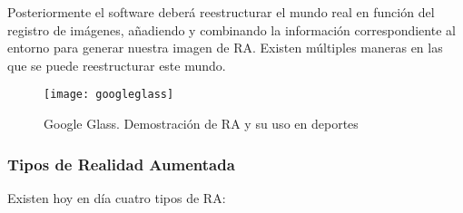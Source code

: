 Posteriormente el software deberá reestructurar el mundo real en función del registro de imágenes, añadiendo y combinando la información correspondiente al entorno para generar nuestra imagen de RA. Existen múltiples maneras en las que se puede reestructurar este mundo. 

\begin{figure}[h]
    \centering
    \texttt{[image: googleglass]}
    \caption{Google Glass. Demostración de RA y su uso en deportes}
    \label{fig:googleglass}
\end{figure}

\subsubsection{Tipos de Realidad Aumentada}

Existen hoy en día cuatro tipos de RA:

